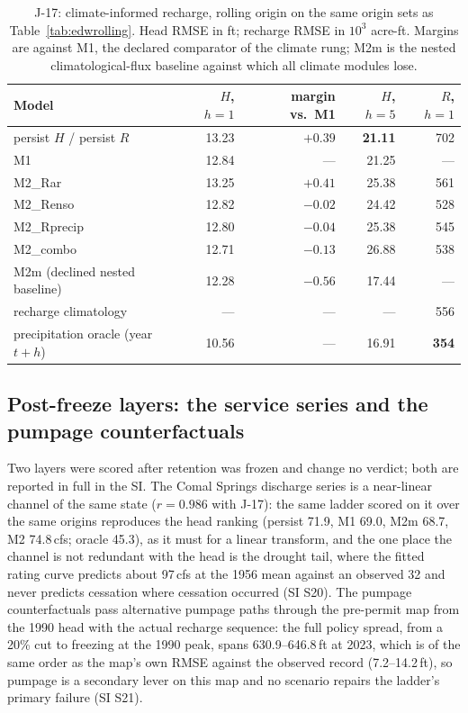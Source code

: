 \begin{table}[!htb]
\centering\small
\caption{J-17: climate-informed recharge, rolling origin on the same origin sets as Table~\ref{tab:edwrolling}. Head RMSE in ft; recharge RMSE in $10^3$ acre-ft. Margins are against M1, the declared comparator of the climate rung; M2m is the nested climatological-flux baseline against which all climate modules lose.}
\label{tab:edwclimate}
\begin{tabular}{@{}lrrrr@{}}
\toprule
Model & $H$, $h{=}1$ & margin vs.\ M1 & $H$, $h{=}5$ & $R$, $h{=}1$ \\
\midrule
persist $H$ / persist $R$ & 13.23 & $+0.39$ & \textbf{21.11} & 702 \\
M1 & 12.84 & --- & 21.25 & --- \\
M2\_Rar & 13.25 & $+0.41$ & 25.38 & 561 \\
M2\_Renso & 12.82 & $-0.02$ & 24.42 & 528 \\
M2\_Rprecip & 12.80 & $-0.04$ & 25.38 & 545 \\
M2\_combo & 12.71 & $-0.13$ & 26.88 & 538 \\
M2m (declined nested baseline) & 12.28 & $-0.56$ & 17.44 & --- \\
recharge climatology & --- & --- & --- & 556 \\
precipitation oracle (year $t{+}h$) & 10.56 & --- & 16.91 & \textbf{354} \\
\bottomrule
\end{tabular}
\end{table}

\subsection{Post-freeze layers: the service series and the pumpage counterfactuals}\label{sec:edw_post}

Two layers were scored after retention was frozen and change no verdict; both are reported in full in the SI. The Comal Springs discharge series is a near-linear channel of the same state ($r=0.986$ with J-17): the same ladder scored on it over the same origins reproduces the head ranking (persist 71.9, M1 69.0, M2m 68.7, M2 74.8\,cfs; oracle 45.3), as it must for a linear transform, and the one place the channel is not redundant with the head is the drought tail, where the fitted rating curve predicts about 97\,cfs at the 1956 mean against an observed 32 and never predicts cessation where cessation occurred (SI S20). The pumpage counterfactuals pass alternative pumpage paths through the pre-permit map from the 1990 head with the actual recharge sequence: the full policy spread, from a 20\% cut to freezing at the 1990 peak, spans 630.9--646.8\,ft at 2023, which is of the same order as the map's own RMSE against the observed record (7.2--14.2\,ft), so pumpage is a secondary lever on this map and no scenario repairs the ladder's primary failure (SI S21).

